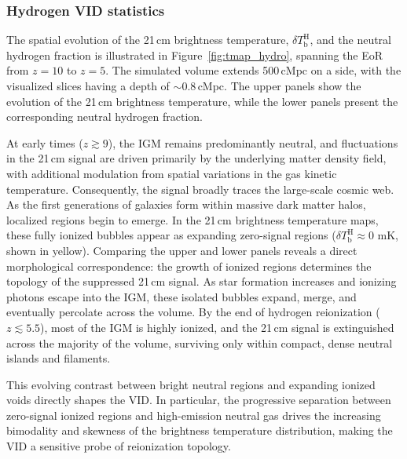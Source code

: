 \documentclass[apj,twocolumn, appendixfloats, twocolappendix, numberedappendix, tighten]{openjournal}
\begin{document}
\subsubsection{Hydrogen VID statistics}



The spatial evolution of the 21\,cm brightness temperature, $\delta T^\mathrm{H}_\mathrm{b}$, and the neutral hydrogen fraction is illustrated in Figure~\ref{fig:tmap_hydro}, spanning the EoR from $z=10$ to $z=5$. The simulated volume extends 500\,cMpc on a side, with the visualized slices having a depth of $\sim 0.8$\,cMpc. The upper panels show the evolution of the 21\,cm brightness temperature, while the lower panels present the corresponding neutral hydrogen fraction.


At early times ($z \gtrsim 9$), the IGM remains predominantly neutral, and fluctuations in the 21\,cm signal are driven primarily by the underlying matter density field, with additional modulation from spatial variations in the gas kinetic temperature. Consequently, the signal broadly traces the large-scale cosmic web. As the first generations of galaxies form within massive dark matter halos, localized  regions begin to emerge. In the 21\,cm brightness temperature maps, these fully ionized bubbles appear as expanding zero-signal regions ($\delta T^\mathrm{H}_\mathrm{b} \approx 0$ mK, shown in yellow). Comparing the upper and lower panels reveals a direct morphological correspondence: the growth of ionized regions determines the topology of the suppressed 21\,cm signal. As star formation increases and ionizing photons escape into the IGM, these isolated bubbles expand, merge, and eventually percolate across the volume. By the end of hydrogen reionization ($z \lesssim 5.5$), most of the IGM is highly ionized, and the 21\,cm signal is extinguished across the majority of the volume, surviving only within compact, dense neutral islands and filaments.


This evolving contrast between bright neutral regions and expanding ionized voids directly shapes the VID. In particular, the progressive separation between zero-signal ionized regions and high-emission neutral gas drives the increasing bimodality and skewness of the brightness temperature distribution, making the VID a sensitive probe of reionization topology.
\end{document}
